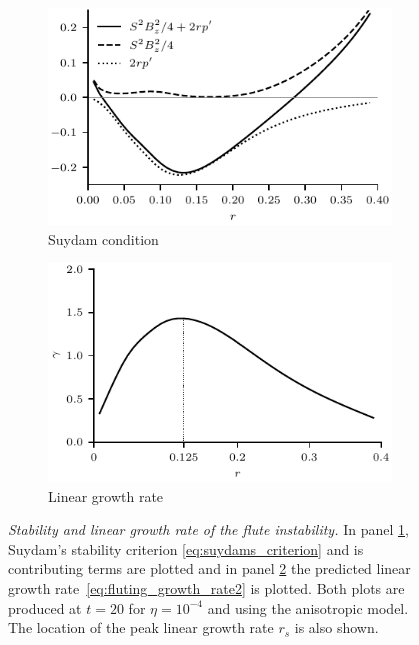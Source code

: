 \documentclass[fleqn,usenatbib]{mnras}
\newcommand{\rev}[1]{{\color{red} {#1}}}
\newcommand{\mycaption}[2]{\caption[#1]{\emph{#1} #2}}
\begin{document}
\begin{figure}
  \centering
    \begin{subfigure}{0.49\textwidth}
      \includegraphics[width=\linewidth]{suydam_condition_4.pdf}
      \caption{Suydam condition}
      \label{fig:suydam_condition_4}
    \end{subfigure}
    \hfill
    \begin{subfigure}{0.49\textwidth}
      \includegraphics[width=\linewidth]{growth_rate_4.pdf}
      \caption{Linear growth rate}
      \label{fig:growth_rate_4}
    \end{subfigure}
\mycaption{Stability and linear growth rate of the flute instability.}{In panel
\ref{fig:suydam_condition_4}, Suydam's stability criterion
\eqref{eq:suydams_criterion} and is contributing terms   are plotted and in
panel \ref{fig:growth_rate_4} the predicted linear growth
rate~\eqref{eq:fluting_growth_rate2} is plotted. Both plots are produced at
$t=20$ for $\eta=10^{-4}$ and using the anisotropic model. The location of the
\rev{peak linear growth rate $r_s$} is also shown.}
\label{fig:stability_and_growth}%
\end{figure}
\end{document}
